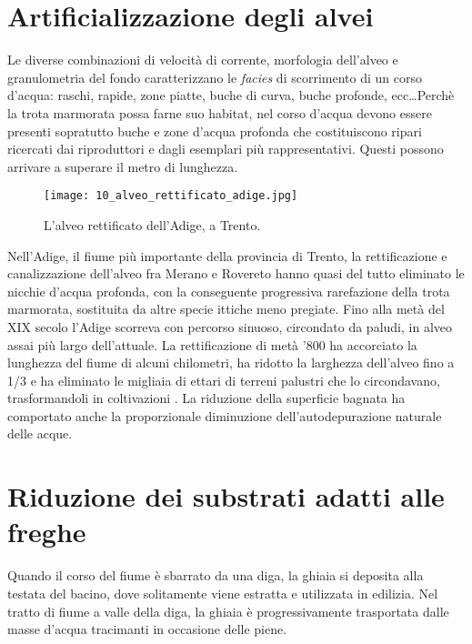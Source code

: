 \documentclass[10pt,twoside,openany,x11names,svgnames,italian,a5paper,dvipsnames,table]{memoir}
\begin{document}
\section{Artificializzazione degli alvei}
Le diverse combinazioni di velocità di corrente, morfologia dell'alveo e granulometria del fondo caratterizzano le \emph{facies} di scorrimento di un corso d’acqua: raschi, rapide, zone piatte, buche di curva, buche profonde, ecc\dots Perchè la trota marmorata possa farne suo habitat, nel corso d'acqua devono essere presenti sopratutto buche e zone d'acqua profonda che costituiscono ripari ricercati dai riproduttori e dagli esemplari più rappresentativi. Questi possono arrivare a superare il metro di lunghezza.
\begin{wrapfigure}[14]{r}{.6\textwidth}
\begin{center}
\vspace{-.6cm}
\texttt{[image: 10\_alveo\_rettificato\_adige.jpg]}
\caption*{L’alveo rettificato dell’Adige, a Trento.}
\end{center}
\end{wrapfigure}Nell’Adige, il fiume più importante della provincia di Trento, la rettificazione e canalizzazione dell’alveo fra Merano e Rovereto hanno quasi del tutto eliminato le nicchie d’acqua profonda, con la conseguente progressiva rarefazione della trota marmorata, sostituita da altre specie ittiche meno pregiate. Fino alla metà del XIX secolo l’Adige scorreva con percorso sinuoso, circondato da paludi, in alveo assai più largo dell’attuale. La rettificazione di metà ’800 ha accorciato la lunghezza del fiume di alcuni chilometri, ha ridotto la larghezza dell’alveo fino a 1/3 e ha eliminato le migliaia di ettari di terreni palustri che lo circondavano, trasformandoli in coltivazioni \cite{Canestrini}. La riduzione della superficie bagnata ha comportato anche la proporzionale diminuzione dell’autodepurazione naturale delle acque.




\section{Riduzione dei substrati adatti alle freghe}
Quando il corso del fiume è sbarrato da una diga, la ghiaia si deposita alla testata del bacino, dove solitamente viene estratta e utilizzata in edilizia. Nel tratto di fiume a valle della diga, la ghiaia è progressivamente trasportata dalle masse d’acqua tracimanti in occasione delle piene. 
\end{document}

